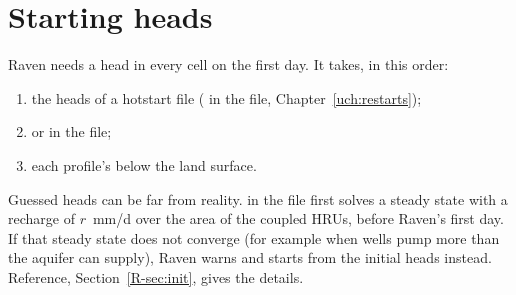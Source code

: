 \section{Starting heads}\label{sec:ustart}
Raven needs a head in every cell on the first day. It takes, in this order:
\begin{enumerate}
\item the heads of a hotstart file ( in the  file, Chapter~\ref{uch:restarts});
\item {} or  in the  file;
\item each profile's  below the land surface.
\end{enumerate}
Guessed heads can be far from reality.  in the  file first solves a
steady state with a recharge of $r$~mm/d over the area of the coupled HRUs, before Raven's first day. If that steady state
does not converge (for example when wells pump more than the aquifer can supply), Raven warns and starts from the initial
heads instead. Reference, Section~\ref{R-sec:init}, gives the details.

